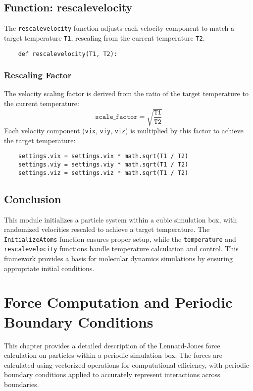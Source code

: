 \documentclass[12pt, ngerman]{report}
\begin{document}
\section{Function: rescalevelocity}
\label{sec:rescale_velocity}

The \texttt{rescalevelocity} function adjusts each velocity component to match a target temperature \texttt{T1}, rescaling from the current temperature \texttt{T2}.

\begin{verbatim}
	def rescalevelocity(T1, T2):
\end{verbatim}

\subsection*{Rescaling Factor}
The velocity scaling factor is derived from the ratio of the target temperature to the current temperature:
\[
\texttt{scale\_factor} = \sqrt{\frac{\texttt{T1}}{\texttt{T2}}}
\]
Each velocity component (\texttt{vix}, \texttt{viy}, \texttt{viz}) is multiplied by this factor to achieve the target temperature:
\begin{verbatim}
	settings.vix = settings.vix * math.sqrt(T1 / T2)
	settings.viy = settings.viy * math.sqrt(T1 / T2)
	settings.viz = settings.viz * math.sqrt(T1 / T2)
\end{verbatim}

\section{Conclusion}
This module initializes a particle system within a cubic simulation box, with randomized velocities rescaled to achieve a target temperature. The \texttt{InitializeAtoms} function ensures proper setup, while the \texttt{temperature} and \texttt{rescalevelocity} functions handle temperature calculation and control. This framework provides a basis for molecular dynamics simulations by ensuring appropriate initial conditions.


\chapter{Force Computation and Periodic Boundary Conditions}
\label{chap:force_computation}

This chapter provides a detailed description of the Lennard-Jones force calculation on particles within a periodic simulation box. The forces are calculated using vectorized operations for computational efficiency, with periodic boundary conditions applied to accurately represent interactions across boundaries.
\end{document}
